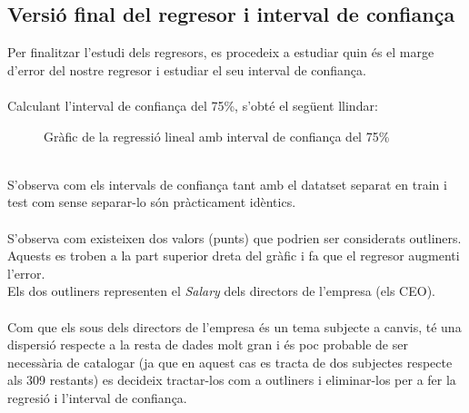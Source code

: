 \documentclass[a4paper, 11pt]{article}
\begin{document}
\subsection{Versió final del regresor i interval de confiança}
Per finalitzar l'estudi dels regresors, es procedeix a estudiar quin és el marge d'error del nostre regresor i estudiar el seu interval de confiança.\\\\
Calculant l'interval de confiança del 75\%, s'obté el següent llindar:
\begin{figure}[h]
\captionsetup[subfigure]{labelformat=empty}
\centering
   \caption{Gràfic de la regressió lineal amb interval de confiança del 75\%}
\end{figure}\\
S'observa com els intervals de confiança tant amb el datatset separat en train i test com sense separar-lo són pràcticament idèntics. \\\\
S'observa com existeixen dos valors (punts) que podrien ser considerats outliners. Aquests es troben a la part superior dreta del gràfic i fa que el regresor augmenti l'error.\\
Els dos outliners representen el \textit{Salary} dels directors de l'empresa (els CEO).\\\\
Com que els sous dels directors de l'empresa és un tema subjecte a canvis, té una dispersió respecte a la resta de dades molt gran i és poc probable de ser necessària de catalogar (ja que en aquest cas es tracta de dos subjectes respecte als 309 restants) es decideix tractar-los com a outliners i eliminar-los per a fer la regresió i l'interval de confiança.\\\\
\end{document}
